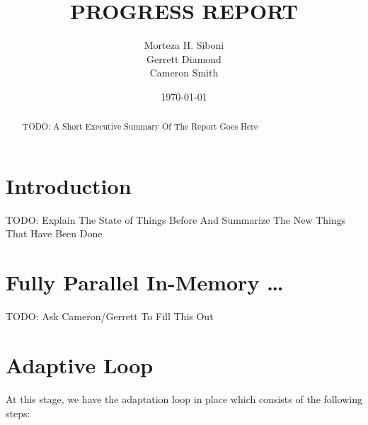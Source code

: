 \documentclass[review,authoryear,12pt]{elsarticle_summary_report}
\begin{document}
\title{PROGRESS REPORT}%

\author[]{Morteza H. Siboni \\
Gerrett Diamond \\
Cameron Smith}



\date{\today}



\begin{abstract}
  TODO: A Short Executive Summary Of The Report Goes Here
\end{abstract}


\maketitle




\section{Introduction}
TODO: Explain The State of Things Before And Summarize The New Things That Have Been Done

\section{Fully Parallel In-Memory \dots}
TODO: Ask Cameron/Gerrett To Fill This Out

\section{Adaptive Loop}
At this stage, we have the adaptation loop in place which consists of the following steps:
\end{document}

